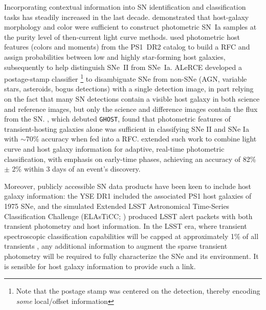 \documentclass[twocolumn]{aastex63}
\begin{document}
Incorporating contextual information into SN identification and classification tasks has steadily increased in the last decade. \cite{Foley2013} demonstrated that host-galaxy morphology and color were sufficient to construct photometric SN~Ia samples at the purity level of then-current light curve methods. \cite{Baldeschi2020} used photometric host features (colors and moments) from the PS1~DR2 catalog to build a RFC and assign probabilities between low and highly star-forming host galaxies, subsequently to help distinguish SNe~II from SNe~Ia. ALeRCE developed a postage-stamp classifier \citep{Carrasco-Davis2021}\footnote{Note that the postage stamp was centered on the detection, thereby encoding \emph{some} local/offset information} to disambiguate SNe from non-SNe (AGN, variable stars, asteroids, bogus detections) with a single detection image, in part relying on the fact that many SN detections contain a visible host galaxy in both science and reference images, but only the science and difference images contain the flux from the SN. \cite{Gagliano2021}, which debuted \texttt{GHOST}, found that photometric features of transient-hosting galaxies alone was sufficient in classifying SNe II and SNe Ia with $\sim$70\% accuracy when fed into a RFC. \cite{2022Gagliano_CCA} extended such work to combine light curve and host galaxy information for adaptive, real-time photometric classification, with emphasis on early-time phases, achieving an accuracy of 82\% $\pm$ 2\% within 3 days of an event's discovery. %

Moreover, publicly accessible SN data products have been keen to include host galaxy information: the YSE DR1 \citep{Aleo2023} included the associated PS1 host galaxies of 1975 SNe, and the simulated Extended LSST Astronomical Time-Series Classification Challenge (ELAsTiCC; \citealt{Narayan2023ELAsTiCC}) produced LSST alert packets with both transient photometry and host information. In the LSST era, where transient spectroscopic classification capabilities will be capped at approximately 1\% of all transients \citep{hambleton2022rubin}, any additional information to augment the sparse transient photometry will be required to fully characterize the SNe and its environment. It is sensible for host galaxy information to provide such a link. \par
\end{document}
